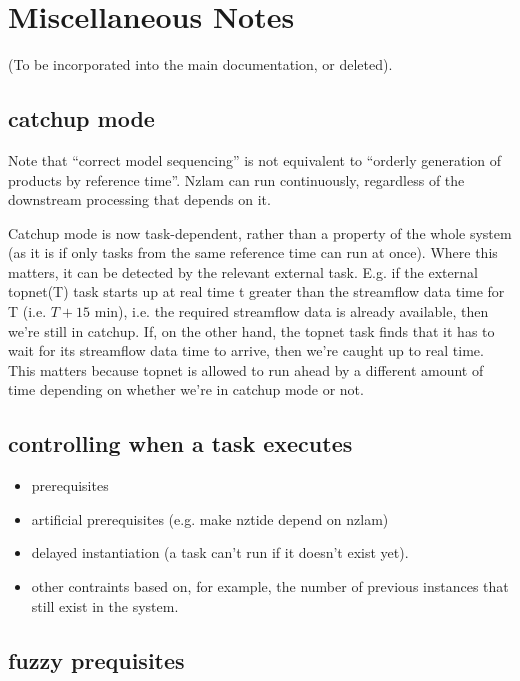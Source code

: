 \documentclass[11pt,a4paper]{article}
\begin{document}
\section{Miscellaneous Notes}

(To be incorporated into the main documentation, or deleted).

\subsection{catchup mode}

Note that ``correct model sequencing'' is not equivalent to ``orderly
generation of products by reference time''.  Nzlam can run continuously,
regardless of the downstream processing that depends on it.

Catchup mode is now task-dependent, rather than a property of the whole
system (as it is if only tasks from the same reference time can run at
once).  Where this matters, it can be detected by the relevant external
task. E.g. if the external topnet(T) task starts up at real time t
greater than the streamflow data time for T (i.e. $T+15$ min), i.e. the
required streamflow data is already available, then we're still in
catchup. If, on the other hand, the topnet task finds that it has to
wait for its streamflow data time to arrive, then we're caught up to
real time.  This matters because topnet is allowed to run ahead by a
different amount of time depending on whether we're in catchup mode or
not.


\subsection{controlling when a task executes}

\begin{itemize}
 \item  prerequisites
 \item artificial prerequisites (e.g. make nztide depend on nzlam)
 \item delayed instantiation (a task can't run if it doesn't exist yet).
 \item other contraints based on, for example, the number of previous
 instances that still exist in the system.
\end{itemize}


\subsection{fuzzy prequisites}
\end{document}
